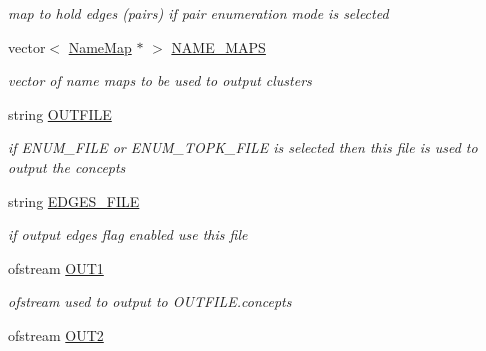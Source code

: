 \begin{DoxyCompactItemize}
\begin{DoxyCompactList}\small\item\em map to hold edges (pairs) if pair enumeration mode is selected \item\end{DoxyCompactList}\item 
\hypertarget{class_lattice_algos_a242b1f9b2ec58cec08c4c5c074c0c1e7}{
vector$<$ \hyperlink{class_name_map}{NameMap} $\ast$ $>$ \hyperlink{class_lattice_algos_a242b1f9b2ec58cec08c4c5c074c0c1e7}{NAME\_\-MAPS}}
\label{class_lattice_algos_a242b1f9b2ec58cec08c4c5c074c0c1e7}

\begin{DoxyCompactList}\small\item\em vector of name maps to be used to output clusters \item\end{DoxyCompactList}\item 
\hypertarget{class_lattice_algos_aaf79cc2e8513fd28bf1e9329c3e678ab}{
string \hyperlink{class_lattice_algos_aaf79cc2e8513fd28bf1e9329c3e678ab}{OUTFILE}}
\label{class_lattice_algos_aaf79cc2e8513fd28bf1e9329c3e678ab}

\begin{DoxyCompactList}\small\item\em if ENUM\_\-FILE or ENUM\_\-TOPK\_\-FILE is selected then this file is used to output the concepts \item\end{DoxyCompactList}\item 
\hypertarget{class_lattice_algos_a5ab62b180232c54b9494d91ea0a4e668}{
string \hyperlink{class_lattice_algos_a5ab62b180232c54b9494d91ea0a4e668}{EDGES\_\-FILE}}
\label{class_lattice_algos_a5ab62b180232c54b9494d91ea0a4e668}

\begin{DoxyCompactList}\small\item\em if output edges flag enabled use this file \item\end{DoxyCompactList}\item 
\hypertarget{class_lattice_algos_a5e06ea8a8e76d5b6019481e778655a5c}{
ofstream \hyperlink{class_lattice_algos_a5e06ea8a8e76d5b6019481e778655a5c}{OUT1}}
\label{class_lattice_algos_a5e06ea8a8e76d5b6019481e778655a5c}

\begin{DoxyCompactList}\small\item\em ofstream used to output to OUTFILE.concepts \item\end{DoxyCompactList}\item 
\hypertarget{class_lattice_algos_ad6ee83e69ef859717cbc747edf4fc306}{
ofstream \hyperlink{class_lattice_algos_ad6ee83e69ef859717cbc747edf4fc306}{OUT2}}
\label{class_lattice_algos_ad6ee83e69ef859717cbc747edf4fc306}


\end{DoxyCompactItemize}
